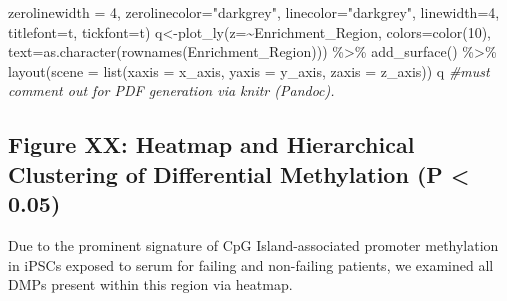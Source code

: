\documentclass[
  10pt,
]{article}
\newenvironment{Shaded}{\begin{snugshade}}{\end{snugshade}}
\newcommand{\AttributeTok}[1]{\textcolor[rgb]{0.77,0.63,0.00}{#1}}
\newcommand{\CommentTok}[1]{\textcolor[rgb]{0.56,0.35,0.01}{\textit{#1}}}
\newcommand{\DecValTok}[1]{\textcolor[rgb]{0.00,0.00,0.81}{#1}}
\newcommand{\FunctionTok}[1]{\textcolor[rgb]{0.00,0.00,0.00}{#1}}
\newcommand{\NormalTok}[1]{#1}
\newcommand{\OtherTok}[1]{\textcolor[rgb]{0.56,0.35,0.01}{#1}}
\newcommand{\SpecialCharTok}[1]{\textcolor[rgb]{0.00,0.00,0.00}{#1}}
\newcommand{\StringTok}[1]{\textcolor[rgb]{0.31,0.60,0.02}{#1}}
\begin{document}
\begin{Shaded}
\begin{Highlighting}[]
                     \AttributeTok{zerolinewidth =} \DecValTok{4}\NormalTok{, }
                    \AttributeTok{zerolinecolor=}\StringTok{"darkgrey"}\NormalTok{, }
                    \AttributeTok{linecolor=}\StringTok{"darkgrey"}\NormalTok{, }
                    \AttributeTok{linewidth=}\DecValTok{4}\NormalTok{, }
                    \AttributeTok{titlefont=}\NormalTok{t, }
                    \AttributeTok{tickfont=}\NormalTok{t)}
\NormalTok{q}\OtherTok{\textless{}{-}}\FunctionTok{plot\_ly}\NormalTok{(}\AttributeTok{z=}\SpecialCharTok{\textasciitilde{}}\NormalTok{Enrichment\_Region, }\AttributeTok{colors=}\FunctionTok{color}\NormalTok{(}\DecValTok{10}\NormalTok{), }
    \AttributeTok{text=}\FunctionTok{as.character}\NormalTok{(}\FunctionTok{rownames}\NormalTok{(Enrichment\_Region))) }\SpecialCharTok{\%\textgreater{}\%} \FunctionTok{add\_surface}\NormalTok{() }\SpecialCharTok{\%\textgreater{}\%} 
    \FunctionTok{layout}\NormalTok{(}\AttributeTok{scene =} \FunctionTok{list}\NormalTok{(}\AttributeTok{xaxis =}\NormalTok{ x\_axis, }\AttributeTok{yaxis =}\NormalTok{ y\_axis, }\AttributeTok{zaxis =}\NormalTok{ z\_axis))}
\NormalTok{q }\CommentTok{\#must comment out for PDF generation via knitr (Pandoc).}
\end{Highlighting}
\end{Shaded}

\hypertarget{figure-xx-heatmap-and-hierarchical-clustering-of-differential-methylation-p-0.05}{%
\subsection{Figure XX: Heatmap and Hierarchical Clustering of
Differential Methylation (P \textless{}
0.05)}\label{figure-xx-heatmap-and-hierarchical-clustering-of-differential-methylation-p-0.05}}

Due to the prominent signature of CpG Island-associated promoter
methylation in iPSCs exposed to serum for failing and non-failing
patients, we examined all DMPs present within this region via heatmap.
\end{document}
